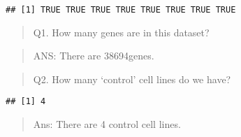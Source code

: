 \documentclass[
]{article}
\newenvironment{Shaded}{\begin{snugshade}}{\end{snugshade}}
\newcommand{\DecValTok}[1]{\textcolor[rgb]{0.00,0.00,0.81}{#1}}
\newcommand{\FunctionTok}[1]{\textcolor[rgb]{0.13,0.29,0.53}{\textbf{#1}}}
\newcommand{\NormalTok}[1]{#1}
\newcommand{\OtherTok}[1]{\textcolor[rgb]{0.56,0.35,0.01}{#1}}
\newcommand{\SpecialCharTok}[1]{\textcolor[rgb]{0.81,0.36,0.00}{\textbf{#1}}}
\newcommand{\StringTok}[1]{\textcolor[rgb]{0.31,0.60,0.02}{#1}}
\begin{document}
\begin{Shaded}
\end{Shaded}

\begin{verbatim}
## [1] TRUE TRUE TRUE TRUE TRUE TRUE TRUE TRUE
\end{verbatim}

\begin{quote}
Q1. How many genes are in this dataset?
\end{quote}

\begin{quote}
ANS: There are 38694genes.
\end{quote}

\begin{quote}
Q2. How many `control' cell lines do we have?
\end{quote}

\begin{Shaded}
\end{Shaded}

\begin{verbatim}
## [1] 4
\end{verbatim}

\begin{quote}
Ans: There are 4 control cell lines.
\end{quote}

\begin{Shaded}
\end{Shaded}
\end{document}
